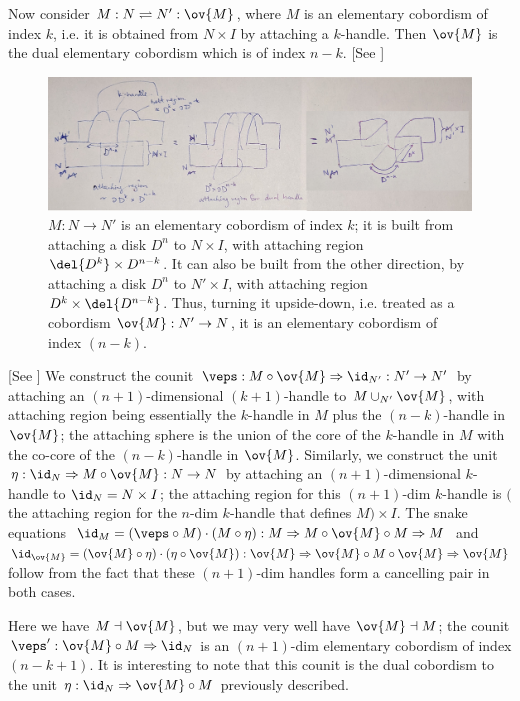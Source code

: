 \documentclass[12pt]{article}
\newcommand{\disk}[1]{{D^{#1}}}
\begin{document}
Now consider $M: N \rightleftharpoons N': \ov{M}$,
where $M$ is an elementary cobordism of index $k$,
i.e. it is obtained from $N \times I$
by attaching a $k$-handle.
Then $\ov{M}$ is the dual elementary cobordism
which is of index $n-k$.
[See ]

\begin{figure}[ht]
\includegraphics[width=15cm]{diagram-dual-handle.jpg}
\caption{$M:N \to N'$ is an elementary cobordism
of index $k$; it is built from attaching a disk $\disk{n}$
to $N \times I$,
with attaching region $\del \disk{k} \times \disk{n-k}$.
It can also be built from the other direction,
by attaching a disk $\disk{n}$
to $N' \times I$,
with attaching region $\disk{k} \times \del \disk{n-k}$.
Thus, turning it upside-down, i.e.
treated as a cobordism $\ov{M}: N' \to N$,
it is an elementary cobordism of index $(n-k)$.
}
\label{f:dual-handle}
\end{figure}

[See ]
We construct the counit
$\veps: M \circ \ov{M} \Rightarrow \id_{N'} : N' \to N'$
by attaching an
$(n+1)$-dimensional $(k+1)$-handle to $M \cup_{N'} \ov{M}$,
with attaching region being essentially the
$k$-handle in $M$ plus the $(n-k)$-handle in $\ov{M}$;
the attaching sphere is the union of the core of the
$k$-handle in $M$
with the co-core of the $(n-k)$-handle in $\ov{M}$.
Similarly,
we construct the unit
$\eta: \id_N \Rightarrow M \circ \ov{M} : N \to N$
by attaching an
$(n+1)$-dimensional $k$-handle to $\id_N = N \times I$;
the attaching region for this $(n+1)$-dim $k$-handle
is
$($the attaching region for the $n$-dim $k$-handle that defines
$M) \times I$.
The snake equations
$\id_M = (\veps \circ M) \cdot (M \circ \eta):
M \Rightarrow M \circ \ov{M} \circ M \Rightarrow M$
and
$\id_{\ov{M}} = (\ov{M} \circ \eta) \cdot (\eta \circ \ov{M}):
\ov{M} \Rightarrow \ov{M} \circ M \circ \ov{M} \Rightarrow \ov{M}$
follow from the fact that
these $(n+1)$-dim handles form a cancelling pair
in both cases.

Here we have $M \dashv \ov{M}$,
but we may very well have $\ov{M} \dashv M$;
the counit $\veps': \ov{M} \circ M \Rightarrow \id_N$
is an $(n+1)$-dim elementary cobordism
of index $(n-k+1)$.
It is interesting to note that
this counit is the dual cobordism to the unit
$\eta: \id_N \Rightarrow \ov{M} \circ M$
previously described.
\end{document}

